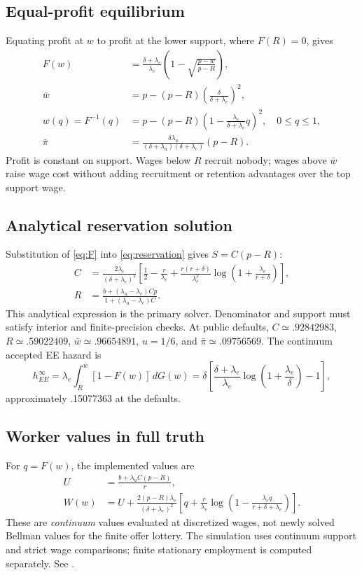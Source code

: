 \documentclass[11pt,letterpaper]{article}
\newcommand{\code}[1]{\texttt{\detokenize{#1}}}
\begin{document}
\subsection{Equal-profit equilibrium}
Equating profit at $w$ to profit at the lower support, where $F(R)=0$,
gives
\begin{align}
F(w)&=\frac{\delta+\lambda_e}{\lambda_e}
 \left(1-\sqrt{\frac{p-w}{p-R}}\right),\label{eq:F}\\
\bar w&=p-(p-R)\left(\frac{\delta}{\delta+\lambda_e}\right)^2,\\
w(q)=F^{-1}(q)&=p-(p-R)
 \left(1-\frac{\lambda_e}{\delta+\lambda_e}q\right)^2,\quad 0\le q\le1,
 \label{eq:inverse}\\
\bar\pi&=\frac{\delta\lambda_u}
 {(\delta+\lambda_u)(\delta+\lambda_e)}(p-R).
\end{align}
Profit is constant on support. Wages below $R$ recruit nobody;
wages above $\bar w$ raise wage cost without adding recruitment or
retention advantages over the top support wage.

\subsection{Analytical reservation solution}
Substitution of \eqref{eq:F} into \eqref{eq:reservation} gives
$S=C(p-R)$:
\begin{align}
C&=\frac{2\lambda_e}{(\delta+\lambda_e)^2}
\left[\frac12-\frac{r}{\lambda_e}
 +\frac{r(r+\delta)}{\lambda_e^2}
 \log\left(1+\frac{\lambda_e}{r+\delta}\right)\right],\label{eq:C}\\
R&=\frac{b+(\lambda_u-\lambda_e)Cp}
        {1+(\lambda_u-\lambda_e)C}.\label{eq:R}
\end{align}
This analytical expression is the primary solver. Denominator and
support must satisfy interior and finite-precision checks.
At public defaults, $C\simeq.92842983$, $R\simeq.59022409$,
$\bar w\simeq.96654891$, $u=1/6$, and $\bar\pi\simeq.09756569$.
The continuum accepted EE hazard is
\begin{equation}
h_{EE}^{\infty}
=\lambda_e\int_R^{\bar w}[1-F(w)]\,dG(w)
=\delta\left[\frac{\delta+\lambda_e}{\lambda_e}
 \log\left(1+\frac{\lambda_e}{\delta}\right)-1\right],\label{eq:ee}
\end{equation}
approximately .15077363 at the defaults.

\subsection{Worker values in full truth}
For $q=F(w)$, the implemented values are
\begin{align}
U&=\frac{b+\lambda_u C(p-R)}{r},\\
W(w)&=U+\frac{2(p-R)\lambda_e}{(\delta+\lambda_e)^2}
\left[q+\frac{r}{\lambda_e}
\log\left(1-\frac{\lambda_e q}{r+\delta+\lambda_e}\right)\right].
\label{eq:value}
\end{align}
These are \emph{continuum} values evaluated at discretized wages, not
newly solved Bellman values for the finite offer lottery. The simulation
uses continuum support and strict wage comparisons; finite stationary
employment is computed separately. See \code{src/fesim_bm_output.mata}.
\end{document}
